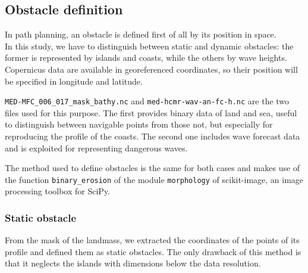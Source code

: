\subsection{Obstacle definition}
In path planning, an obstacle is defined first of all by its position in space.\\
In this study, we have to distinguish between static and dynamic obstacles: the former is represented by islands and coasts, while the others by wave heights. Copernicus data are available in georeferenced coordinates, so their position will be specified in longitude and latitude.

\texttt{MED-MFC\_006\_017\_mask\_bathy.nc} and \texttt{med-hcmr-wav-an-fc-h.nc} are the two files used for this purpose. The first provides binary data of land and sea, useful to distinguish between navigable points from those not, but especially for reproducing the profile of the coasts. The second one includes wave forecast data and is exploited for representing dangerous waves.

The method used to define obstacles is the same for both cases and makes use of the function \texttt{binary\_erosion} of the module \texttt{morphology} of scikit-image, an image processing toolbox for SciPy.

\subsubsection{Static obstacle}
From the mask of the landmass, we extracted the coordinates of the points of its profile and defined them as static obstacles. The only drawback of this method is that it neglects the islands with dimensions below the data resolution. 
